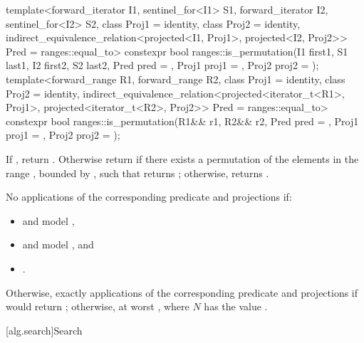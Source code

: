 %
\begin{itemdecl}
template<forward_iterator I1, sentinel_for<I1> S1, forward_iterator I2,
         sentinel_for<I2> S2, class Proj1 = identity, class Proj2 = identity,
         indirect_equivalence_relation<projected<I1, Proj1>,
                                       projected<I2, Proj2>> Pred = ranges::equal_to>
  constexpr bool ranges::is_permutation(I1 first1, S1 last1, I2 first2, S2 last2,
                                        Pred pred = {},
                                        Proj1 proj1 = {}, Proj2 proj2 = {});
template<forward_range R1, forward_range R2,
         class Proj1 = identity, class Proj2 = identity,
         indirect_equivalence_relation<projected<iterator_t<R1>, Proj1>,
                                       projected<iterator_t<R2>, Proj2>> Pred = ranges::equal_to>
  constexpr bool ranges::is_permutation(R1&& r1, R2&& r2, Pred pred = {},
                                        Proj1 proj1 = {}, Proj2 proj2 = {});
\end{itemdecl}

\begin{itemdescr}
\pnum
\returns
If , return .
Otherwise return  if there exists a permutation of the elements
in the range , bounded by ,
such that
returns ;
otherwise, returns .

\pnum
\complexity
No applications of the corresponding predicate and projections if:
\begin{itemize}
\item {} and  model ,
\item {} and  model , and
\item {}.
\end{itemize}
Otherwise, exactly  applications
of the corresponding predicate and projections
if 
would return ;
otherwise, at worst , where $N$ has the value .
\end{itemdescr}

[alg.search]{Search}

